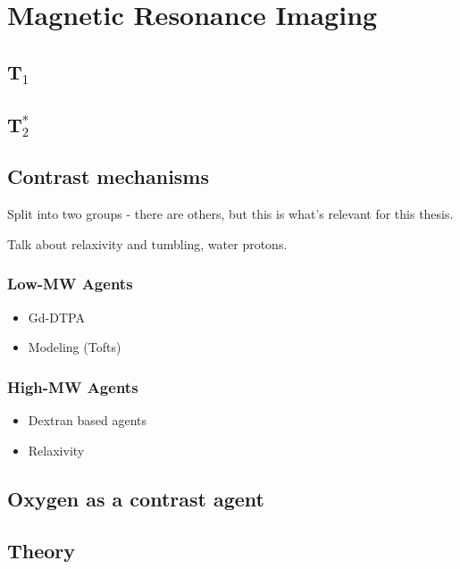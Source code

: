 \section{Magnetic Resonance Imaging}
\subsection{T$_1$}
\subsection{T$_2^*$}

\subsection{Contrast mechanisms}
Split into two groups - there are others, but this is what's relevant for this thesis.

Talk about relaxivity and tumbling, water protons.

\subsubsection{Low-MW Agents}
\begin{itemize}
\item Gd-DTPA
\item Modeling (Tofts)
\end{itemize}

\subsubsection{High-MW Agents}
\begin{itemize}
\item Dextran based agents
\item Relaxivity
\end{itemize}

\subsection{Oxygen as a contrast agent}
	\subsection{Theory}

